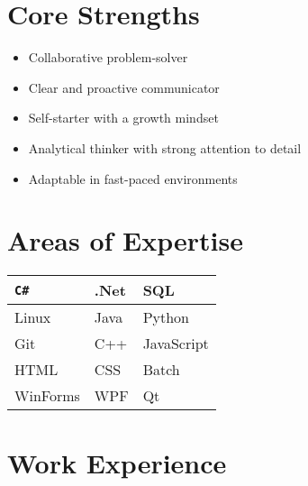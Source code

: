 \documentclass[a4paper,12pt]{article}
\begin{document}
\section{Core Strengths}
\begin{center}
    \begin{itemize}
        \item Collaborative problem-solver
        \item Clear and proactive communicator
        \item Self-starter with a growth mindset
        \item Analytical thinker with strong attention to detail
        \item Adaptable in fast-paced environments
    \end{itemize}
\end{center}

\section{Areas of Expertise}
\begin{center}
    \begin{tabular}{|p{} | p{} | p{}|} 
     \hline
     \texttt{C\#} & .Net & SQL \\
     \hline
     Linux & Java & Python \\
     \hline
     Git & C++ & JavaScript \\
     \hline
     HTML & CSS & Batch \\
     \hline
     WinForms & WPF & Qt \\
     \hline
    \end{tabular}
\end{center}    


\section{Work Experience}
\end{document}
